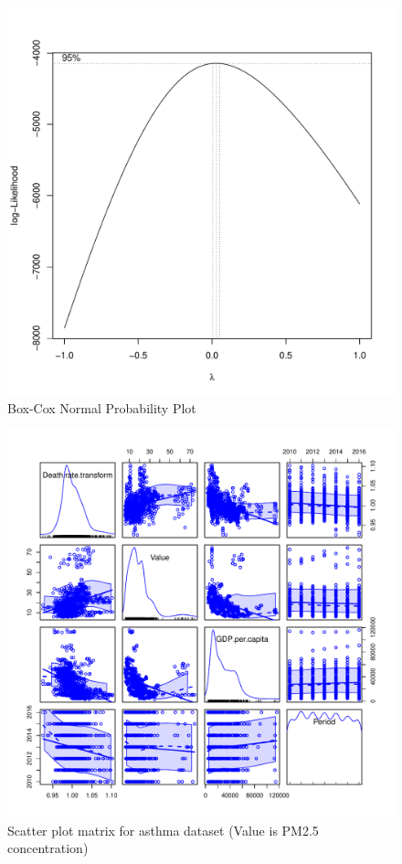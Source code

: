 \documentclass[12pt, letterpaper, twoside]{article}\usepackage[]{graphicx}\usepackage[]{xcolor}
\begin{document}
\begin{figure}[t]
\includegraphics[scale=0.6]{boxcox.pdf}
\centering
\caption{Box-Cox Normal Probability Plot}
\label{fig:Figure 1}
    \vspace{1cm}
\end{figure}
\begin{figure}[t]
\includegraphics[scale=0.5]{scatterplotmatrix.asthma.pdf}
\centering
\caption{Scatter plot matrix for asthma dataset (Value is PM2.5 concentration)}
\label{fig:Figure 2}
    \vspace{1cm}
\end{figure}
\end{document}
